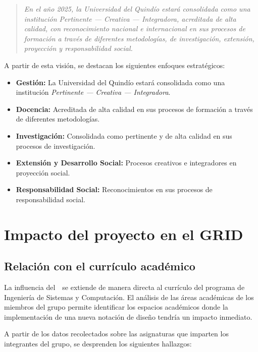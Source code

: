 \begin{quote}
	\textit{En el año 2025, la Universidad del Quindío estará consolidada como una institución \textit{Pertinente --- Creativa --- Integradora}, acreditada de alta calidad, con reconocimiento nacional e internacional en sus procesos de formación a través de diferentes metodologías, de investigación, extensión, proyección y responsabilidad social.}
\end{quote}

A partir de esta visión, se destacan los siguientes enfoques estratégicos:

\begin{itemize}
	\item \textbf{Gestión:} La Universidad del Quindío estará consolidada como una institución \textit{Pertinente --- Creativa --- Integradora}.

	\item \textbf{Docencia:} Acreditada de alta calidad en sus procesos de formación a través de diferentes metodologías.

	\item \textbf{Investigación:} Consolidada como pertinente y de alta calidad en sus procesos de investigación.

	\item \textbf{Extensión y Desarrollo Social:} Procesos creativos e integradores en proyección social.

	\item \textbf{Responsabilidad Social:} Reconocimientos en sus procesos de responsabilidad social.
\end{itemize}

\section{Impacto del proyecto en el GRID}

\subsection{Relación con el currículo académico}
La influencia del~\GRID~se extiende de manera directa al currículo del programa de Ingeniería de Sistemas y Computación. El análisis de las áreas académicas de los miembros del grupo permite identificar los espacios académicos donde la implementación de una nueva notación de diseño tendría un impacto inmediato.

A partir de los datos recolectados sobre las asignaturas que imparten los integrantes del grupo, se desprenden los siguientes hallazgos:

